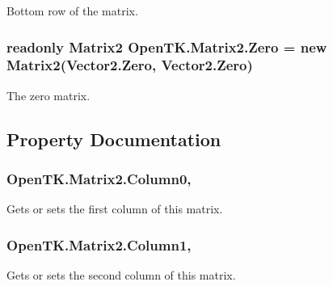 Bottom row of the matrix. 

\hypertarget{struct_open_t_k_1_1_matrix2_aa14232ae27ca06ba9e721da3f8153dd5}{
\subsubsection[{Zero}]{\setlength{\rightskip}{0pt plus 5cm}readonly {\bf Matrix2} Open\-T\-K.\-Matrix2.\-Zero = new {\bf Matrix2}(Vector2.\-Zero, Vector2.\-Zero)\hspace{0.3cm}{\ttfamily [static]}}}\label{struct_open_t_k_1_1_matrix2_aa14232ae27ca06ba9e721da3f8153dd5}


The zero matrix. 



\subsection{Property Documentation}
\hypertarget{struct_open_t_k_1_1_matrix2_a8f6fa1f04466c18e03ed65fe77979b5b}{
\subsubsection[{Column0}]{ Open\-T\-K.\-Matrix2.\-Column0\hspace{0.3cm}{\ttfamily [get]}, {\ttfamily [set]}}}\label{struct_open_t_k_1_1_matrix2_a8f6fa1f04466c18e03ed65fe77979b5b}


Gets or sets the first column of this matrix. 

\hypertarget{struct_open_t_k_1_1_matrix2_acc042415fe491ade747c36781e063e7f}{
\subsubsection[{Column1}]{ Open\-T\-K.\-Matrix2.\-Column1\hspace{0.3cm}{\ttfamily [get]}, {\ttfamily [set]}}}\label{struct_open_t_k_1_1_matrix2_acc042415fe491ade747c36781e063e7f}


Gets or sets the second column of this matrix. 


